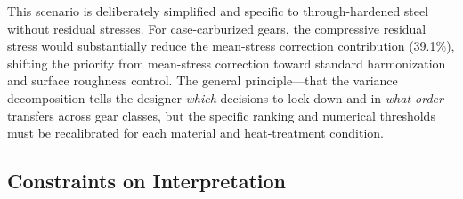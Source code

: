 \documentclass[12pt,a4paper]{article}
\begin{document}
This scenario is deliberately simplified and specific to
through-hardened steel without residual stresses. For case-carburized
gears, the compressive residual stress would substantially reduce the
mean-stress correction contribution (39.1\%), shifting the priority
from mean-stress correction toward standard harmonization and surface
roughness control. The general principle---that the variance
decomposition tells the designer \emph{which} decisions to lock down
and in \emph{what order}---transfers across gear classes, but the
specific ranking and numerical thresholds must be recalibrated for
each material and heat-treatment condition.

\subsection{Constraints on Interpretation}
\label{sec:constraints}
\end{document}
